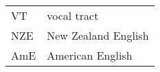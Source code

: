 \begin{table}[H]
\centering
\label{notation-list}
\begin{tabular}{ll}
VT      & vocal tract             \\
NZE     & New Zealand English                     \\
AmE     & American English     \\
\end{tabular}
\end{table}